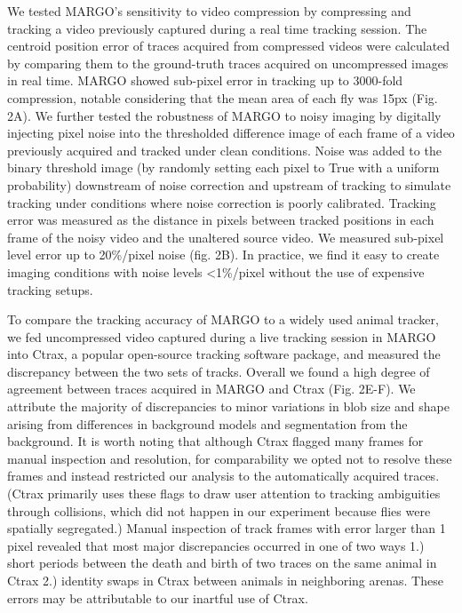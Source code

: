 \documentclass[10pt]{article}
\begin{document}
\begin{multicols}{2}
We tested MARGO's sensitivity to video compression by compressing and tracking a video previously captured during a real time tracking session. The centroid position error of traces acquired from compressed videos were calculated by comparing them to the ground-truth traces acquired on uncompressed images in real time. MARGO showed sub-pixel error in tracking up to 3000-fold compression, notable considering that the mean area of each fly was 15px (Fig. 2A). We further tested the robustness of MARGO to noisy imaging by digitally injecting pixel noise into the thresholded difference image of each frame of a video previously acquired and tracked under clean conditions. Noise was added to the binary threshold image (by randomly setting each pixel to True with a uniform probability) downstream of noise correction and upstream of tracking to simulate tracking under conditions where noise correction is poorly calibrated. Tracking error was measured as the distance in pixels between tracked positions in each frame of the noisy video and the unaltered source video.  We measured sub-pixel level error up to 20\%/pixel noise (fig. 2B). In practice, we find it easy to create imaging conditions with noise levels <1\%/pixel without the use of expensive tracking setups.

To compare the tracking accuracy of MARGO to a widely used animal tracker, we fed uncompressed video captured during a live tracking session in MARGO into Ctrax\cite{Branson_High_2009}, a popular open-source tracking software package, and measured the discrepancy between the two sets of tracks. Overall we found a high degree of agreement between traces acquired in MARGO and Ctrax (Fig. 2E-F). We attribute the majority of discrepancies to minor variations in blob size and shape arising from differences in background models and segmentation from the background. It is worth noting that although Ctrax flagged many frames for manual inspection and resolution, for comparability we opted not to resolve these frames and instead restricted our analysis to the automatically acquired traces. (Ctrax primarily uses these flags to draw user attention to tracking ambiguities through collisions, which did not happen in our experiment because flies were spatially segregated.) Manual inspection of track frames with error larger than 1 pixel revealed that most major discrepancies occurred in one of two ways 1.) short periods between the death and birth of two traces on the same animal in Ctrax 2.) identity swaps in Ctrax between animals in neighboring arenas. These errors may be attributable to our inartful use of Ctrax.


\end{multicols}
\end{document}
